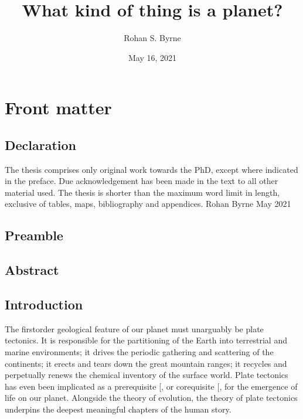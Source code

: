 \documentclass[letterpaper,10pt,english]{jupyterBook}
\title{What kind of thing is a planet?}
\date{May 16, 2021}
\author{Rohan S.\@{} Byrne}
\begin{document}
\pagestyle{empty}
\sphinxmaketitle
\pagestyle{plain}
\sphinxtableofcontents
\pagestyle{normal}
\label{\detokenize{index::doc}}


\sphinxAtStartPar
{}


\part{Front matter}


\chapter{Declaration}
\label{\detokenize{frontmatter/declaration:declaration}}\label{\detokenize{frontmatter/declaration::doc}}
\sphinxAtStartPar
The thesis comprises only original work towards the PhD, except where indicated in the preface. Due acknowledgement has been made in the text to all other material used. The thesis is shorter than the maximum word limit in length, exclusive of tables, maps, bibliography and appendices.
Rohan Byrne
May 2021


\chapter{Preamble}
\label{\detokenize{frontmatter/preamble:preamble}}\label{\detokenize{frontmatter/preamble::doc}}

\chapter{Abstract}
\label{\detokenize{frontmatter/abstract:abstract}}\label{\detokenize{frontmatter/abstract::doc}}

\chapter{Introduction}
\label{\detokenize{frontmatter/introduction:introduction}}\label{\detokenize{frontmatter/introduction::doc}}
\sphinxAtStartPar
The first\sphinxhyphen{}order geological feature of our planet must unarguably be plate tectonics. It is responsible for the partitioning of the Earth into terrestrial and marine environments; it drives the periodic gathering and scattering of the continents; it erects and tears down the great mountain ranges; it recycles and perpetually renews the chemical inventory of the surface world. Plate tectonics has even been implicated as a prerequisite {[}, \sphinxcite{references:id417}{]} or co\sphinxhyphen{}requisite {[}, \sphinxcite{references:id435}{]} for the emergence of life on our planet. Alongside the theory of evolution, the theory of plate tectonics underpins the deepest meaningful chapters of the human story.
\end{document}
